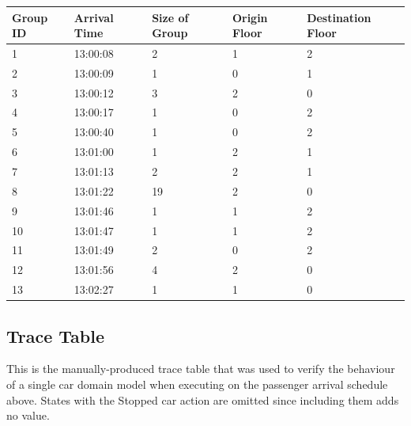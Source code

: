 \documentclass{UoYCSproject}
\begin{document}
\begin{tabular}{l | l | l | l | l}
	Group ID & Arrival Time & Size of Group & Origin Floor & Destination Floor \\
	\hline
	1 & 13:00:08 & 2 & 1 & 2 \\
	2 & 13:00:09 & 1 & 0 & 1 \\
	3 & 13:00:12 & 3 & 2 & 0 \\
	4 & 13:00:17 & 1 & 0 & 2 \\
	5 & 13:00:40 & 1 & 0 & 2 \\
	6 & 13:01:00 & 1 & 2 & 1 \\
	7 & 13:01:13 & 2 & 2 & 1 \\
	8 & 13:01:22 & 19 & 2 & 0 \\
	9 & 13:01:46 & 1 & 1 & 2 \\
	10 & 13:01:47 & 1 & 1 & 2 \\
	11 & 13:01:49 & 2 & 0 & 2 \\
	12 & 13:01:56 & 4 & 2 & 0 \\
	13 & 13:02:27 & 1 & 1 & 0 \\	
\end{tabular}

\subsection{Trace Table}

This is the manually-produced trace table that was used to verify the behaviour of a single car domain model when executing on the passenger arrival schedule above.  States with the Stopped car action are omitted since including them adds no value.
\end{document}
